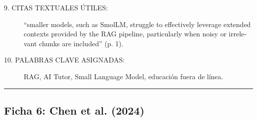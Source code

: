 \begin{description}
	\item[9. CITAS TEXTUALES ÚTILES:] \foreignlanguage{english}{``smaller models, such as SmolLM, struggle to effectively leverage extended contexts provided by the RAG pipeline, particularly when noisy or irrelevant chunks are included''} (p. 1).
	\item[10. PALABRAS CLAVE ASIGNADAS:] RAG, AI Tutor, Small Language Model, educación fuera de línea.
\end{description}

\vspace{0.5cm}
\hrule
\vspace{0.5cm}

\subsection*{Ficha 6: Chen et al. (2024)}
